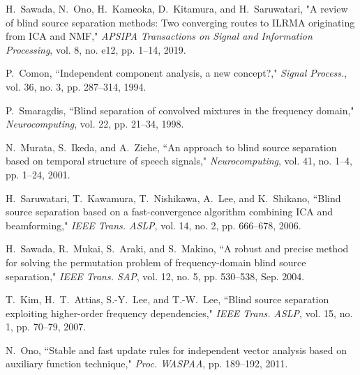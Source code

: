 \documentclass[honka]{nitkagawathesis}%
\begin{document}






\backmatter



\begin{thebibliography}{99}
  
  H.~Sawada, N.~Ono, H.~Kameoka, D.~Kitamura, and H.~Saruwatari, "A review of blind source separation methods: Two converging routes to ILRMA originating from ICA and NMF," {\em APSIPA Transactions on Signal and Information Processing}, vol. 8, no. e12, pp. 1–14, 2019.
  
  P.~Comon, ``Independent component analysis, a new concept?," {\em Signal Process.}, vol. 36, no. 3, pp. 287--314, 1994.
  
  P.~Smaragdis, ``Blind separation of convolved mixtures in the frequency domain," {\em Neurocomputing}, vol. 22, pp. 21--34, 1998.
  
  N.~Murata, S.~Ikeda, and A.~Ziehe, ``An approach to blind source separation based on temporal structure of speech signals,"  {\em Neurocomputing}, vol. 41, no. 1–4, pp. 1--24, 2001.
  
  H.~Saruwatari, T.~Kawamura, T.~Nishikawa, A.~Lee, and K.~Shikano, ``Blind source separation based on a fast-convergence algorithm combining ICA and beamforming,"  {\em IEEE Trans. ASLP}, vol. 14, no. 2, pp. 666--678, 2006.
  
  H.~Sawada, R.~Mukai, S.~Araki, and S.~Makino, ``A robust and precise method for solving the permutation problem of frequency-domain blind source separation,"  {\em IEEE Trans. SAP}, vol. 12, no. 5, pp. 530--538, Sep. 2004.
  
  T.~Kim, H.~T.~Attias, S.-Y.~Lee, and T.-W.~Lee, ``Blind source separation exploiting higher-order frequency dependencies," {\em  IEEE Trans. ASLP}, vol. 15, no. 1, pp. 70--79, 2007.
  
  N.~Ono, ``Stable and fast update rules for independent vector analysis based on auxiliary function technique," {\em  Proc. WASPAA}, pp. 189--192, 2011.
  

\end{thebibliography}
\end{document}
